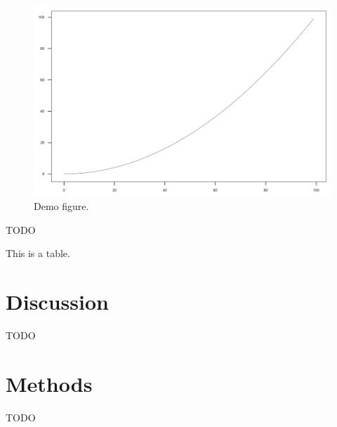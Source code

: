 \documentclass[a4paper,10pt,abstracton]{scrartcl}
\begin{document}
\begin{figure}[t!]
  \includegraphics[width=1.1\linewidth,center]{artwork/demo.png}
  \caption{Demo figure.}
  \label{fig:demo}
\end{figure}

TODO

\begin{table}[h]
  \centering
  
  \caption{This is a table.}
  \label{table:demo}
\end{table}

\section*{Discussion}

TODO

\section*{Methods}

TODO

\printbibliography
\end{document}
